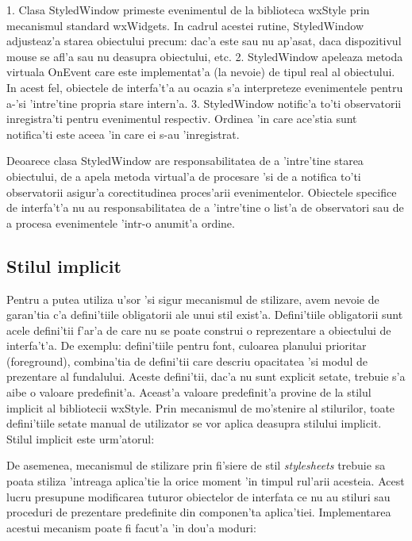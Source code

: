 1. Clasa StyledWindow primeste evenimentul de la biblioteca wxStyle prin mecanismul standard wxWidgets. In cadrul acestei rutine, StyledWindow adjusteaz'a starea obiectului precum: dac'a este sau nu ap'asat, daca dispozitivul mouse se afl'a sau nu deasupra obiectului, etc.
2. StyledWindow apeleaza metoda virtuala On{Event} care este implementat'a (la nevoie) de tipul real al obiectului. In acest fel, obiectele de interfa't'a au ocazia s'a interpreteze evenimentele pentru a-'si 'intre'tine propria stare intern'a.
3. StyledWindow notific'a to'ti observatorii inregistra'ti pentru evenimentul respectiv. Ordinea 'in care ace'stia sunt notifica'ti este aceea 'in care ei s-au 'inregistrat.

Deoarece clasa StyledWindow are responsabilitatea de a 'intre'tine starea obiectului, de a apela metoda virtual'a de procesare 'si de a notifica to'ti observatorii asigur'a corectitudinea proces'arii evenimentelor. Obiectele specifice de interfa't'a nu au responsabilitatea de a 'intre'tine o list'a de observatori sau de a procesa evenimentele 'intr-o anumit'a ordine.

\subsection{Stilul implicit}
Pentru a putea utiliza u'sor 'si sigur mecanismul de stilizare, avem nevoie de garan'tia c'a defini'tiile obligatorii ale unui stil exist'a. Defini'tiile obligatorii sunt acele defini'tii f'ar'a de care nu se poate construi o reprezentare a obiectului de interfa't'a. De exemplu: defini'tiile pentru font, culoarea planului prioritar (foreground), combina'tia de defini'tii care descriu opacitatea 'si modul de prezentare al fundalului. Aceste defini'tii, dac'a nu sunt explicit setate, trebuie s'a aibe o valoare predefinit'a. Aceast'a valoare predefinit'a provine de la stilul implicit al bibliotecii wxStyle. Prin mecanismul de mo'stenire al stilurilor, toate defini'tiile setate manual de utilizator se vor aplica deasupra stilului implicit. Stilul implicit este urm'atorul:


De asemenea, mecanismul de stilizare prin fi'siere de stil \emph{stylesheets} trebuie sa poata stiliza 'intreaga aplica'tie la orice moment 'in timpul rul'arii acesteia. Acest lucru presupune modificarea tuturor obiectelor de interfata ce nu au stiluri sau proceduri de prezentare predefinite din componen'ta aplica'tiei. Implementarea acestui mecanism poate fi facut'a 'in dou'a moduri:

